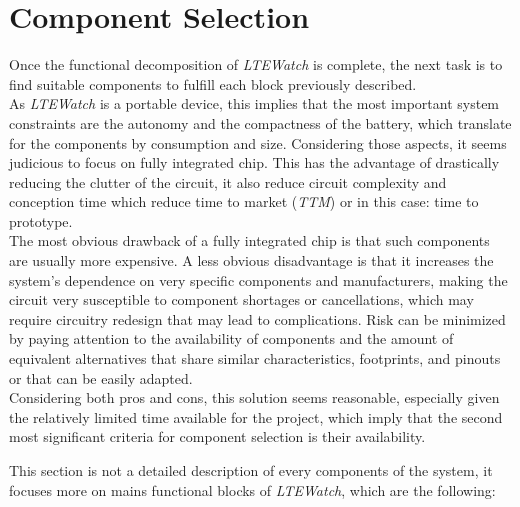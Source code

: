 \documentclass[report.tex]{subfiles}
\begin{document}
\section{Component Selection} \label{sec:comp_sel}
Once the functional decomposition of \textit{LTEWatch} is complete, the next task is to find suitable components to fulfill each block previously described.\\

As \textit{LTEWatch} is a portable device, this implies that the most important system constraints are the autonomy and the compactness of the battery, which translate for the components by consumption and size. Considering those aspects, it seems judicious to focus on fully integrated chip. This has the advantage of drastically reducing the clutter of the circuit, it also reduce circuit complexity and conception time which reduce time to market (\textit{TTM}) or in this case: time to prototype.\\

The most obvious drawback of a fully integrated chip is that such components are usually more expensive. A less obvious disadvantage is that it increases the system's dependence on very specific components and manufacturers, making the circuit very susceptible to component shortages or cancellations, which may require circuitry redesign that may lead to complications. Risk can be minimized by paying attention to the availability of components and the amount of equivalent alternatives that share similar characteristics, footprints, and pinouts or that can be easily adapted.\\

Considering both pros and cons, this solution seems reasonable, especially given the relatively limited time available for the project, which imply that the second most significant criteria for component selection is their availability.\\

\pagebreak

This section is not a detailed description of every components of the system, it focuses more on mains functional blocks of \textit{LTEWatch}, which are the following:
\end{document}
